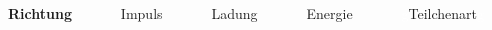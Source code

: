 \begin{frame}[t]
{\begin{columns}
      \begin{column}{0.18\textwidth}
        \begin{block}{}
          \centering
          \textbf{Richtung}
        \end{block}
      \end{column}
      \begin{column}{0.025\textwidth}
      \end{column}
      \begin{column}{0.18\textwidth}
        \begin{block}{}
          \centering
          Impuls        
        \end{block}
      \end{column}
      \begin{column}{0.025\textwidth}
      \end{column}
      \begin{column}{0.18\textwidth}
        \begin{block}{}
          \centering
          Ladung
        \end{block}
      \end{column}
      \begin{column}{0.025\textwidth}
      \end{column}
      \begin{column}{0.18\textwidth}
        \begin{block}{}
          \centering
          Energie
        \end{block}
      \end{column}
      \begin{column}{0.02\textwidth}
      \end{column}
      \begin{column}{0.18\textwidth}
        \begin{block}{}
          \centering
          \textcolor{white}{g}Teilchenart\textcolor{white}{g}
        \end{block}
      \end{column}
      \begin{column}{0.005\textwidth}
      \end{column}
    \end{columns}
  }
  \vskip0.25cm
  \begin{columns}
    \begin{column}{0.4\textwidth}
      \centering
    \end{column}
    \begin{column}{0.6\textwidth}
      \centering
    \end{column}    
  \end{columns}
\end{frame}

